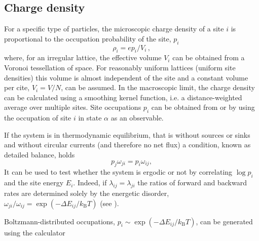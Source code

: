 \subsection{Charge density}
\label{sec:occupation}

For a specific type of particles, the microscopic charge density of a site $i$ is proportional to the occupation probability of the site, $p_i$
\begin{equation}
 \rho_i = e p_i / V_i\, ,
\end{equation}
where,  for an irregular lattice, the effective volume $V_i$ can be obtained from a Voronoi tessellation of space. For reasonably uniform lattices (uniform site densities) this volume is almost independent of the site and a constant volume per cite, $V_i = V/N$, can be assumed.  In the macroscopic limit, the charge density can be calculated using a smoothing kernel function, i.e. a distance-weighted average over multiple sites. Site occupations $p_i$ can be obtained from  or   by using the occupation of site $i$ in state $\alpha$ as an observable.

If the system is in thermodynamic equilibrium, that is without sources or sinks and without circular currents (and therefore no net flux) a condition, known as detailed balance, holds
%
\begin{equation}
\label{equ:detailed_balance}
  p_j \omega_{ji} = p_i \omega_{ij},
\end{equation}
%
It can be used to test whether the system is ergodic or not by correlating $\log p_i$ and the site energy $E_i$. Indeed, if $\lambda_{ij} = \lambda_{ji}$ the ratios of forward and backward rates are determined solely by the energetic disorder, $\omega_{ji} / \omega_{ij} = \exp(-\Delta E_{ij} / k_\text{B} T)$ (see ).

Boltzmann-distributed occupations, $p_i \sim \exp(-\Delta E_{ij} / k_\text{B} T)$, can be generated using the  calculator
\vskip 0.2cm
\label{sec:oboltzmann}
{\noindent \small \ctprun \opt \xmloptions  \seg  \xmlsegments \sql  \sqlstate \exe {} }

